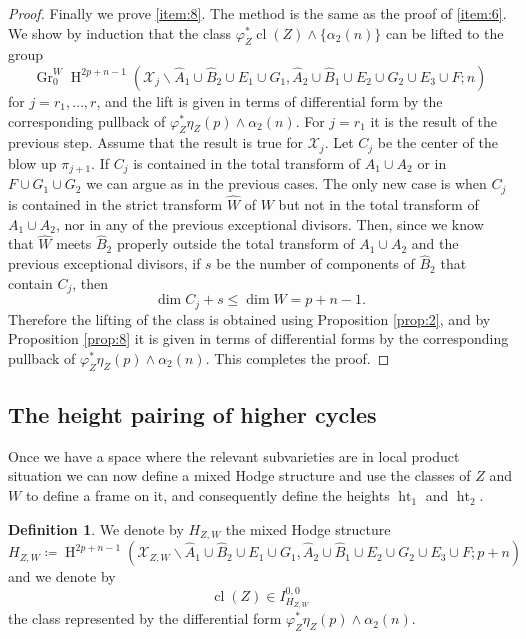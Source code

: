 \documentclass[11pt,a4paper]{amsart}
\newcommand{\caX}{\mathcal{X}}
\DeclareMathOperator {\Gr} {Gr}
\DeclareMathOperator {\cl}{cl}
\DeclareMathOperator{\Ht}{ht}
\DeclareMathOperator{\rH}{H}
\numberwithin{equation}{section}
\theoremstyle{plain}
\theoremstyle{definition}
\newtheorem{df}[prop]{Definition}
\begin{document}
\begin{proof}
  Finally we prove \ref{item:8}. The method is the same as the proof
  of  \ref{item:6}. We show by induction that the class
  $\varphi_{Z}^{\ast}\cl(Z)\wedge \{\alpha _2(n)\}$
  can be lifted to the group
   \begin{displaymath}
     \Gr_{0}^{W}\rH^{2p+n-1}(\caX_{j}\smallsetminus \widehat A_{1}\cup
     \widehat B_{2}\cup
     E_{1}\cup G_1, \widehat A_{2}\cup \widehat B_1\cup E_{2}\cup G_2\cup
     E_{3}\cup F; n)
   \end{displaymath}
   for $j=r_1,\dots, r$, and the lift is given in terms of
   differential form by the corresponding pullback of
   $\varphi^\ast_Z\eta_Z(p)\wedge \alpha_{2}(n)$. For $j=r_1$ it is the
   result of the previous step.  Assume that the result is true
   for $\caX_{j}$. Let $C_{j}$ be the center of the blow up $\pi
   _{j+1}$.
   If $C_{j}$ is contained in the
total transform of $A_{1}\cup A_{2}$ or in $F\cup G_1\cup G_2$ we can argue as in the
previous cases. The only new case is when 
 $C_{j}$ is
contained in the strict transform $\widehat W$ of $W$ but not in the total transform of $A_1\cup
A_2$, nor in any of the previous exceptional divisors. Then,  since we
know that $\widehat W$ meets $\widehat B_{2}$ 
properly outside the total transform of $A_1\cup
A_2$ and the previous exceptional divisors, if $s$ be the number of
components of $\widehat B_{2}$ that contain 
$C_{j}$, then 
\begin{displaymath}
  \dim C_{j} + s \le \dim W = p+n-1.
\end{displaymath}
Therefore the lifting of the class is obtained using Proposition \ref{prop:2}, and
by Proposition \ref{prop:8} it is given in terms of differential forms by the
corresponding pullback of $\varphi^\ast_Z\eta_Z(p)\wedge \alpha_{2}(n)$.
This completes the proof.
\end{proof}


\subsection{The height pairing of higher cycles}
\label{sec:height-pair-high}
Once we have a space where the relevant subvarieties are in local
product situation we can now define a mixed Hodge structure and use
the classes of $Z$ and $W$ to define a frame on it, and consequently define the heights $\Ht_{1}$ and $\Ht_{2}$.
\begin{df}\label{df-5-9}
  We denote by $H_{Z,W}$ the mixed Hodge structure
  \begin{displaymath}
    H_{Z,W}\coloneqq  \rH^{2p+n-1}(\caX_{Z,W}\smallsetminus \widehat A_1\cup
    \widehat B_2\cup E_1\cup G_1   , \widehat A_2\cup
    \widehat B_1\cup E_2\cup G_2\cup E_3\cup F;p+n)
  \end{displaymath}
  and we denote by
  \begin{displaymath}
    \cl(Z) \in I^{0,0}_{H_{Z,W}} 
  \end{displaymath}
  the class represented by the differential form
    $\varphi_{Z}^{\ast}\eta_Z(p)\wedge \alpha _2(n)$.
  \end{df}
\end{document}
